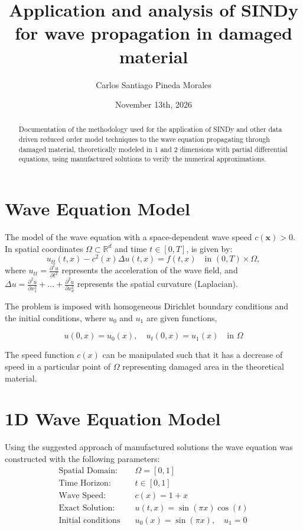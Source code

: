 \documentclass[11pt,a4paper]{article}
\title{Application and analysis of SINDy for wave propagation in damaged material}
\author{Carlos Santiago Pineda Morales}
\date{November 13th, 2026}
\begin{document}
\maketitle

\begin{abstract}
Documentation of the methodology used for the application of SINDy and other data driven reduced order model techniques to the wave equation propagating through damaged material, theoretically modeled in 1 and 2 dimensions with partial differential equations, using manufactured solutions to verify the numerical approximations.
\end{abstract}

\section{Wave Equation Model}
The model of the wave equation with a space-dependent wave speed $c(\mathbf{x}) > 0$. In spatial coordinates $\Omega \subset \mathbb{R}^d$ and time $t \in [0, T]$, is given by:
\begin{equation}
    u_{tt}(t, x) - c^2(x) \Delta u(t, x) = f(t, x) \quad \text{in } (0, T) \times \Omega,
\end{equation}
where $u_{tt} = \frac{\partial^2 u}{\partial t^2}$ represents the acceleration of the wave field, and $\Delta u = \frac{\partial^2 u}{\partial x_{1}^2} + ... + \frac{\partial^2 u}{\partial x_{d}^2}$ represents the spatial curvature (Laplacian).

The problem is imposed with homogeneous Dirichlet boundary conditions and the initial conditions, where $u_{0}$ and $u_{1}$ are given functions,

\begin{equation}
    u(0, x) = u_{0}(x), \quad u_{t}(0, x) = u_{1}(x) \quad \text{in } \Omega
\end{equation}

The speed function $c(x)$ can be manipulated such that it has a decrease of speed in a particular point of $\Omega$ representing damaged area in the theoretical material.

\section{1D Wave Equation Model}
Using the suggested approach of manufactured solutions the wave equation was constructed with the following parameters:
\begin{align}
    \text{Spatial Domain:} & \quad \Omega = [0, 1] \\
    \text{Time Horizon:} & \quad t \in [0, 1] \\
    \text{Wave Speed:} & \quad c(x) = 1 + x \\
    \text{Exact Solution:} & \quad u(t, x) = \sin(\pi x) \cos(t) \\
    \text{Initial conditions} & \quad u_{0}(x)= \sin(\pi x), \quad u_{1} = 0
\end{align}
\end{document}
